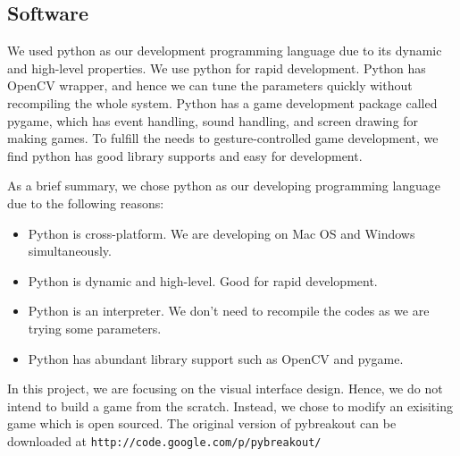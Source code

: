 \documentclass[10pt,twocolumn,letterpaper]{article}
\begin{document}
\subsection{Software}
We used python as our development programming language due to 
its dynamic and high-level properties. We use python for rapid 
development. Python has OpenCV wrapper, and hence we can tune 
the parameters quickly without recompiling the whole system. 
Python has a game development package called pygame, which 
has event handling, sound handling, and screen drawing for making 
games. To fulfill the needs to gesture-controlled game development, 
we find python has good library supports and easy for development.

As a brief summary, we chose python as our developing programming 
language due to the following reasons:
\begin{itemize}
	\item Python is cross-platform. We are developing on Mac OS and Windows simultaneously.
	\item Python is dynamic and high-level. Good for rapid development.
	\item Python is an interpreter. We don't need to recompile the codes as we are trying some parameters.
	\item Python has abundant library support such as OpenCV and pygame. 
\end{itemize}

In this project, we are focusing on the visual interface 
design. Hence, we do not intend to build a game from the scratch. 
Instead, we chose to modify an exisiting game which is open sourced. 
The original version of pybreakout can be downloaded at
\verb"http://code.google.com/p/pybreakout/"
\end{document}
